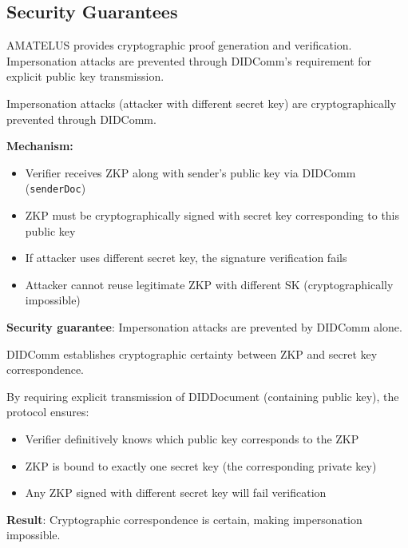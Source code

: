 \subsection{Security Guarantees}

AMATELUS provides cryptographic proof generation and verification. Impersonation attacks are prevented
through DIDComm's requirement for explicit public key transmission.

\begin{theorem}
  \label{thm:didcomm-impersonation-prevention}
  Impersonation attacks (attacker with different secret key) are cryptographically prevented through DIDComm.

  \textbf{Mechanism:}
  \begin{itemize}
    \item Verifier receives ZKP along with sender's public key via DIDComm (\texttt{senderDoc})
    \item ZKP must be cryptographically signed with secret key corresponding to this public key
    \item If attacker uses different secret key, the signature verification fails
    \item Attacker cannot reuse legitimate ZKP with different SK (cryptographically impossible)
  \end{itemize}

  \textbf{Security guarantee}: Impersonation attacks are prevented by DIDComm alone.
  \leanok
\end{theorem}

\begin{theorem}
  \label{thm:secret-key-correspondence-certainty}
  DIDComm establishes cryptographic certainty between ZKP and secret key correspondence.

  By requiring explicit transmission of DIDDocument (containing public key), the protocol ensures:
  \begin{itemize}
    \item Verifier definitively knows which public key corresponds to the ZKP
    \item ZKP is bound to exactly one secret key (the corresponding private key)
    \item Any ZKP signed with different secret key will fail verification
  \end{itemize}

  \textbf{Result}: Cryptographic correspondence is certain, making impersonation impossible.
  \leanok
\end{theorem}


